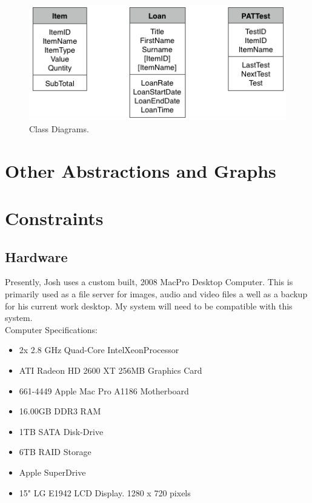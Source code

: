 \begin{figure}[H]
    \centerline{\includegraphics[width=\textwidth]{./Analysis/Class_Definitions/Class_diagrams.pdf}}
    \caption{Class Diagrams.} \label{fig:relationship_diagram}
\end{figure}

\newpage

\section{Other Abstractions and Graphs}

\section{Constraints}

\subsection{Hardware}

Presently, Josh uses a custom built, 2008 MacPro Desktop Computer. This is primarily used as a file server for images, audio and video files a well as a backup for his current work desktop. My system will need to be compatible with this system.\\

\noindent Computer Specifications:
\begin{itemize}
    \item 2x 2.8 GHz Quad-Core Intel\textregistered Xeon\texttrademark Processor
    \item ATI Radeon HD 2600 XT 256MB Graphics Card
    \item 661-4449 Apple Mac Pro A1186 Motherboard
    \item 16.00GB DDR3 RAM
    \item 1TB SATA Disk-Drive
    \item 6TB RAID Storage
    \item Apple SuperDrive
    \item 15" LG E1942 LCD Display. 1280 x 720 pixels
\end{itemize}

